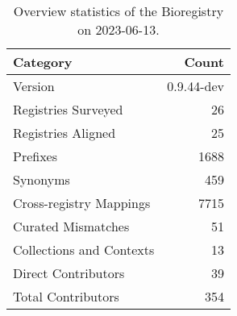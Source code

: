 \begin{table}
\caption{Overview statistics of the Bioregistry on 2023-06-13.}
\label{tab:bioregistry-summary}
\begin{tabular}{lr}
\toprule
Category & Count \\
\midrule
Version & 0.9.44-dev \\
Registries Surveyed & 26 \\
Registries Aligned & 25 \\
Prefixes & 1688 \\
Synonyms & 459 \\
Cross-registry Mappings & 7715 \\
Curated Mismatches & 51 \\
Collections and Contexts & 13 \\
Direct Contributors & 39 \\
Total Contributors & 354 \\
\bottomrule
\end{tabular}
\end{table}
